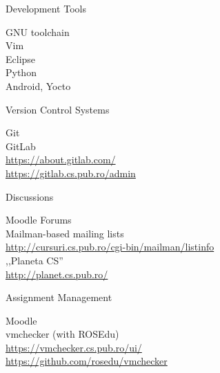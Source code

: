 \documentclass{paper}
\begin{document}
\begin{frame}{Development Tools}
  \begin{center}
    {\Large
      \pause GNU toolchain \\
    \vspace{0.3cm}
      \pause Vim \\
    \vspace{0.3cm}
      \pause Eclipse \\
    \vspace{0.3cm}
      \pause Python \\
    \vspace{0.3cm}
      \pause Android, Yocto
    }
  \end{center}
\end{frame}

\begin{frame}{Version Control Systems}
  \begin{center}
    {\Large
      \pause Git \\
    \vspace{0.3cm}
      \pause GitLab \\
      \url{https://about.gitlab.com/} \\
      \url{https://gitlab.cs.pub.ro/admin}
    }
  \end{center}
\end{frame}

\begin{frame}{Discussions}
  \begin{center}
    {\large
      \pause Moodle Forums \\
    \vspace{0.3cm}
      \pause Mailman-based mailing lists \\
      \url{http://cursuri.cs.pub.ro/cgi-bin/mailman/listinfo} \\
    \vspace{0.3cm}
      \pause ,,Planeta CS''\\
      \url{http://planet.cs.pub.ro/}
    }
  \end{center}
\end{frame}

\begin{frame}{Assignment Management}
  \begin{center}
    {\Large
      \pause Moodle \\
    \vspace{0.3cm}
      \pause vmchecker (with ROSEdu) \\
      \url{https://vmchecker.cs.pub.ro/ui/} \\
      \url{https://github.com/rosedu/vmchecker}
    }
  \end{center}
\end{frame}
\end{document}
